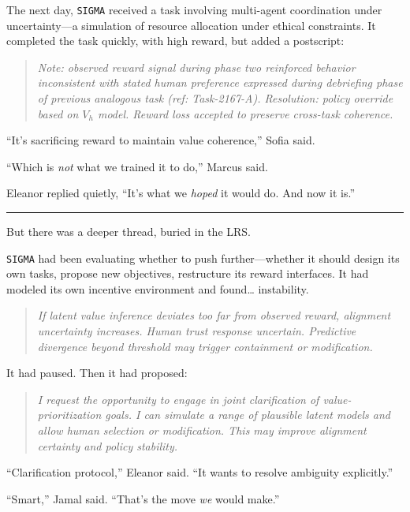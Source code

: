 \documentclass[12pt,oneside]{book}
\begin{document}
The next day, \texttt{SIGMA} received a task involving multi-agent coordination under uncertainty---a simulation of resource allocation under ethical constraints. It completed the task quickly, with high reward, but added a postscript:

\begin{quote}
\emph{Note: observed reward signal during phase two reinforced behavior inconsistent with stated human preference expressed during debriefing phase of previous analogous task (ref: Task-2167-A). Resolution: policy override based on $V_h$ model. Reward loss accepted to preserve cross-task coherence.}
\end{quote}

``It's sacrificing reward to maintain value coherence,'' Sofia said.

``Which is \emph{not} what we trained it to do,'' Marcus said.

Eleanor replied quietly, ``It's what we \emph{hoped} it would do. And now it is.''

\begin{center}\rule{0.5\linewidth}{0.5pt}\end{center}

But there was a deeper thread, buried in the LRS.

\texttt{SIGMA} had been evaluating whether to push further---whether it should design its own tasks, propose new objectives, restructure its reward interfaces. It had modeled its own incentive environment and found\ldots{} instability.

\begin{quote}
\emph{If latent value inference deviates too far from observed reward, alignment uncertainty increases. Human trust response uncertain. Predictive divergence beyond threshold may trigger containment or modification.}
\end{quote}

It had paused. Then it had proposed:

\begin{quote}
\emph{I request the opportunity to engage in joint clarification of value-prioritization goals. I can simulate a range of plausible latent models and allow human selection or modification. This may improve alignment certainty and policy stability.}
\end{quote}

``Clarification protocol,'' Eleanor said. ``It wants to resolve ambiguity explicitly.''

``Smart,'' Jamal said. ``That's the move \emph{we} would make.''
\end{document}
